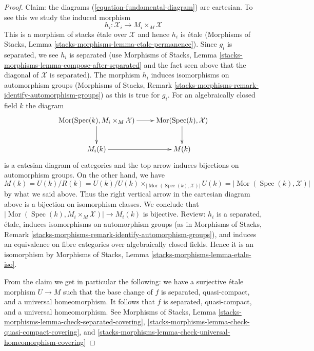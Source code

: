 \documentclass[10pt,a4paper]{amsart}
\theoremstyle{plain}
\theoremstyle{definition}
\theoremstyle{remark}
\numberwithin{equation}{subsection}
\def\Spec{\mathop{\mathrm{Spec}}}
\def\Mor{\mathop{\mathrm{Mor}}\nolimits}
\begin{document}
\begin{proof}
\medskip\noindent
Claim: the diagrams (\ref{equation-fundamental-diagram}) are cartesian.
To see this we study the induced morphism
$$
h_i : \mathcal{X}_i \longrightarrow M_i \times_M \mathcal{X}
$$
This is a morphism of stacks \'etale over $\mathcal{X}$
and hence $h_i$ is \'etale (Morphisms of Stacks, Lemma
\ref{stacks-morphisms-lemma-etale-permanence}).
Since $g_i$ is separated, we see $h_i$ is separated
(use Morphisms of Stacks, Lemma
\ref{stacks-morphisms-lemma-compose-after-separated} and the fact
seen above that the diagonal of $\mathcal{X}$ is separated).
The morphism $h_i$ induces isomorphisms on automorphism groups
(Morphisms of Stacks, Remark
\ref{stacks-morphisms-remark-identify-automorphism-groups})
as this is true for $g_i$. For an algebraically closed field $k$
the diagram
$$
\xymatrix{
\Mor(\Spec(k), M_i \times_M \mathcal{X}) \ar[r] \ar[d] &
\Mor(\Spec(k), \mathcal{X}) \ar[d] \\
M_i(k) \ar[r] &
M(k)
}
$$
is a catesian diagram of categories and the top arrow
induces bijections on automorphism groups.
On the other hand, we have
$$
M(k) = U(k)/R(k) = U(k)/
U(k) \times_{|\Mor(\Spec(k), \mathcal{X})|} U(k) =
|\Mor(\Spec(k), \mathcal{X})|
$$
by what we said above. Thus the right vertical arrow in the
cartesian diagram above is a bijection on isomorphism classes.
We conclude that
$|\Mor(\Spec(k), M_i \times_M \mathcal{X})| \to M_i(k)$ is bijective.
Review: $h_i$ is a separated, \'etale, induces isomorphisms on
automorphism groups (as in Morphisms of Stacks, Remark
\ref{stacks-morphisms-remark-identify-automorphism-groups}), and
induces an equivalence on fibre categories over algebraically closed fields.
Hence it is an isomorphism by Morphisms of Stacks, Lemma
\ref{stacks-morphisms-lemma-etale-iso}.

\medskip\noindent
From the claim we get in particular the following:
we have a surjective \'etale morphism $U \to M$
such that the base change of $f$ is separated, quasi-compact,
and a universal homeomorphism. It follows that $f$ is separated,
quasi-compact, and a universal homeomorphism.
See Morphisms of Stacks, Lemma
\ref{stacks-morphisms-lemma-check-separated-covering},
\ref{stacks-morphisms-lemma-check-quasi-compact-covering}, and
\ref{stacks-morphisms-lemma-check-universal-homeomorphism-covering}


\end{proof}
\end{document}
